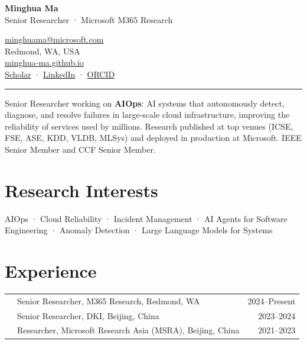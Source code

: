 \documentclass[10pt,letterpaper]{article}
\newcommand{\dated}[2]{\noindent{\textbf{#1}\hfill{\color{subtle}\small #2}}\par}
\begin{document}
\begin{minipage}[b]{0.62\textwidth}
  {\sffamily\bfseries\Huge\color{accent} Minghua Ma}\\[0.7ex]
  {\sffamily\large Senior Researcher \textnormal{·} Microsoft M365 Research}
\end{minipage}\hfill
\begin{minipage}[b]{0.36\textwidth}
  \raggedleft\small
  \href{mailto:minghuama@microsoft.com}{minghuama@microsoft.com}\\[0.3ex]
  Redmond, WA, USA\\[0.3ex]
  \href{https://minghua-ma.github.io/}{minghua-ma.github.io}\\[0.3ex]
  \href{https://scholar.google.com/citations?user=A8It-HkAAAAJ}{Scholar} \textnormal{·}
  \href{https://www.linkedin.com/in/minghua-ma-547202100/}{LinkedIn} \textnormal{·}
  \href{https://orcid.org/0000-0002-6303-1731}{ORCID}
\end{minipage}

\vspace{0.7ex}
{\color{accent}\rule{\linewidth}{1.5pt}}
\vspace{0.5ex}

\noindent
Senior Researcher working on \textbf{AIOps}: AI systems that autonomously detect, diagnose, and resolve failures in
large-scale cloud infrastructure, improving the reliability of services used by millions. Research published at
top venues (ICSE, FSE, ASE, KDD, VLDB, MLSys) and deployed in production at Microsoft.
IEEE Senior Member and CCF Senior Member.

\section{Research Interests}
\vspace{-0.2ex}
AIOps \textnormal{·} Cloud Reliability \textnormal{·} Incident Management \textnormal{·} AI Agents for Software
Engineering \textnormal{·} Anomaly Detection \textnormal{·} Large Language Models for Systems

\section{Experience}
\dated{Microsoft}{2021–Present}
\vspace{0.2ex}
\begin{tabularx}{\linewidth}{@{}p{1.2em}X r@{}}
  & Senior Researcher, M365 Research, Redmond, WA & {\color{subtle}\small 2024–Present}\\
  & Senior Researcher, DKI, Beijing, China & {\color{subtle}\small 2023–2024}\\
  & Researcher, Microsoft Research Asia (MSRA), Beijing, China & {\color{subtle}\small 2021–2023}\\
\end{tabularx}
\end{document}
